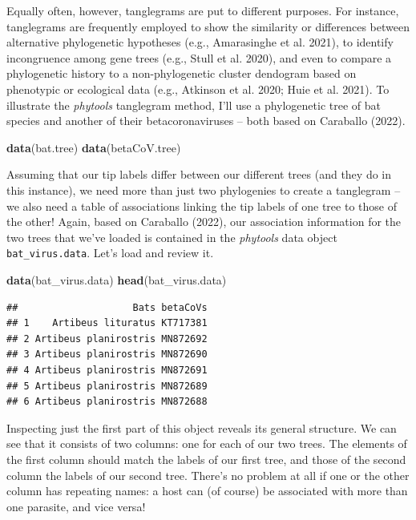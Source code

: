 \documentclass[fleqn,10pt,lineno]{wlpeerj} %
\newenvironment{Shaded}{\begin{snugshade}}{\end{snugshade}}
\newcommand{\FunctionTok}[1]{\textcolor[rgb]{0.13,0.29,0.53}{\textbf{#1}}}
\newcommand{\NormalTok}[1]{#1}
\begin{document}
Equally often, however, tanglegrams are put to different purposes. For instance, tanglegrams are frequently employed to show the similarity or differences between alternative phylogenetic hypotheses (e.g., Amarasinghe et al. 2021), to identify incongruence among gene trees (e.g., Stull et al. 2020), and even to compare a phylogenetic history to a non-phylogenetic cluster dendogram based on phenotypic or ecological data (e.g., Atkinson et al. 2020; Huie et al. 2021). To illustrate the \emph{phytools} tanglegram method, I'll use a phylogenetic tree of bat species and another of their betacoronaviruses -- both based on Caraballo (2022).

\begin{Shaded}
\begin{Highlighting}[]
\FunctionTok{data}\NormalTok{(bat.tree)}
\FunctionTok{data}\NormalTok{(betaCoV.tree)}
\end{Highlighting}
\end{Shaded}

Assuming that our tip labels differ between our different trees (and they do in this instance), we need more than just two phylogenies to create a tanglegram -- we also need a table of associations linking the tip labels of one tree to those of the other! Again, based on Caraballo (2022), our association information for the two trees that we've loaded is contained in the \emph{phytools} data object \texttt{bat\_virus.data}. Let's load and review it.

\begin{Shaded}
\begin{Highlighting}[]
\FunctionTok{data}\NormalTok{(bat\_virus.data)}
\FunctionTok{head}\NormalTok{(bat\_virus.data)}
\end{Highlighting}
\end{Shaded}

\begin{verbatim}
##                    Bats betaCoVs
## 1    Artibeus lituratus KT717381
## 2 Artibeus planirostris MN872692
## 3 Artibeus planirostris MN872690
## 4 Artibeus planirostris MN872691
## 5 Artibeus planirostris MN872689
## 6 Artibeus planirostris MN872688
\end{verbatim}

Inspecting just the first part of this object reveals its general structure. We can see that it consists of two columns: one for each of our two trees. The elements of the first column should match the labels of our first tree, and those of the second column the labels of our second tree. There's no problem at all if one or the other column has repeating names: a host can (of course) be associated with more than one parasite, and vice versa!
\end{document}
